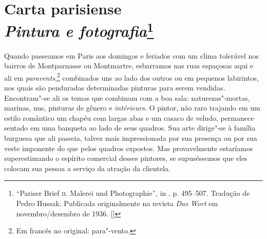 \chapter{Carta parisiense \\
\emph{Pintura e fotografia}\footnote[*]{``Pariser Brief \textsc{ii}. Malerei und Photographie'', in
  , p. 495--507. Tradução de Pedro Hussak. Publicada originalmente na revista \emph{Das Wort} em novembro/dezembro de 1936. []}}


Quando passeamos em Paris aos domingos e feriados com um clima tolerável
nos bairros de Montparnasse ou Montmartre, esbarramos nas ruas espaçosas
aqui e ali em \emph{paravents},\footnote{Em francês no original:
 para"-vento. \versal{[N.~T.]}} combinados uns ao lado dos outros ou em pequenos
labirintos, nos quais são penduradas determinadas pinturas para serem
vendidas. Encontram"-se ali os temas que combinam com a boa sala:
naturezas"-mortas, marinas, nus, pinturas de gênero e \emph{intérieurs}.
O pintor, não raro trajando em um estilo romântico um chapéu com largas abas e
um casaco de veludo, permanece sentado em uma banqueta ao lado de seus
quadros. Sua arte dirige"-se à família burguesa que ali passeia,
talvez mais impressionada por sua presença ou por sua veste
imponente do que pelos quadros expostos. Mas provavelmente estaríamos
superestimando o espírito comercial desses pintores, se supuséssemos que
eles colocam sua pessoa a serviço da atração da clientela.


